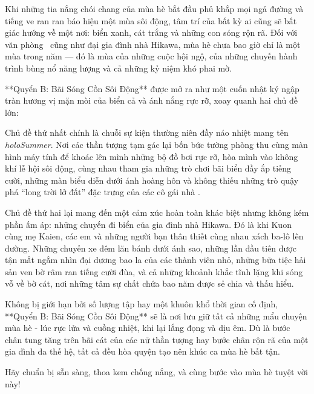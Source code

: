 \documentclass[main.tex]{subfiles}
\begin{document}
Khi những tia nắng chói chang của mùa hè bắt đầu phủ khắp mọi ngả đường và tiếng ve ran ran báo hiệu một mùa sôi động, tâm trí của bất kỳ ai cũng sẽ bất giác hướng về một nơi: biển xanh, cát trắng và những con sóng rộn rã. Đối với văn phòng \hll\ cũng như đại gia đình nhà Hikawa, mùa hè chưa bao giờ chỉ là một mùa trong năm — đó là mùa của những cuộc hội ngộ, của những chuyến hành trình bùng nổ năng lượng và cả những kỷ niệm khó phai mờ.

**Quyển B: Bãi Sóng Cồn Sôi Động** được mở ra như một cuốn nhật ký ngập tràn hương vị mặn mòi của biển cả và ánh nắng rực rỡ, xoay quanh hai chủ đề lớn:

Chủ đề thứ nhất chính là chuỗi sự kiện thường niên đầy náo nhiệt mang tên \textit{holoSummer}. Nơi các thần tượng tạm gác lại bốn bức tường phòng thu cùng màn hình máy tính để khoác lên mình những bộ đồ bơi rực rỡ, hòa mình vào không khí lễ hội sôi động, cùng nhau tham gia những trò chơi bãi biển đầy ắp tiếng cười, những màn biểu diễn dưới ánh hoàng hôn và không thiếu những trò quậy phá ``long trời lở đất'' đặc trưng của các cô gái nhà \hll.

Chủ đề thứ hai lại mang đến một cảm xúc hoàn toàn khác biệt nhưng không kém phần ấm áp: những chuyến đi biển của gia đình nhà Hikawa. Đó là khi Kuon cùng mẹ Kaien, các em và những người bạn thân thiết cùng nhau xách ba-lô lên đường. Những chuyến xe đêm lăn bánh dưới ánh sao, những lần đầu tiên được tận mắt ngắm nhìn đại dương bao la của các thành viên nhỏ, những bữa tiệc hải sản ven bờ râm ran tiếng cười đùa, và cả những khoảnh khắc tĩnh lặng khi sóng vỗ về bờ cát, nơi những tâm sự chất chứa bao năm được sẻ chia và thấu hiểu.

Không bị giới hạn bởi số lượng tập hay một khuôn khổ thời gian cố định, **Quyển B: Bãi Sóng Cồn Sôi Động** sẽ là nơi lưu giữ tất cả những mẩu chuyện mùa hè - lúc rực lửa và cuồng nhiệt, khi lại lắng đọng và dịu êm. Dù là bước chân tung tăng trên bãi cát của các nữ thần tượng hay bước chân rộn rã của một gia đình đa thế hệ, tất cả đều hòa quyện tạo nên khúc ca mùa hè bất tận.

Hãy chuẩn bị sẵn sàng, thoa kem chống nắng, và cùng bước vào mùa hè tuyệt vời này!

\end{document}
